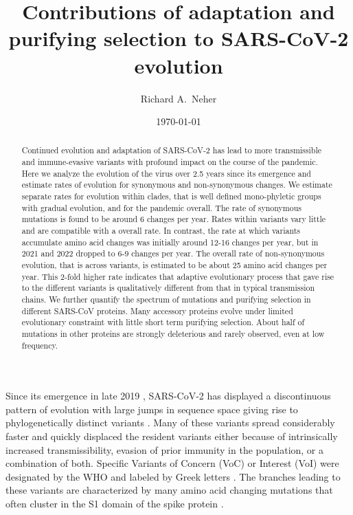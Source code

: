 \documentclass[aps,rmp, twocolumn]{revtex4}
\begin{document}
\title{Contributions of adaptation and purifying selection to SARS-CoV-2 evolution}
\author{Richard A.~Neher}
\address{Biozentrum, University of Basel, Basel, Switzerland }
\address{Swiss Institute of Bioinformatics, Switzerland }

\date{\today}

\begin{abstract}
Continued evolution and adaptation of SARS-CoV-2 has lead to more transmissible and immune-evasive variants with profound impact on the course of the pandemic.
Here we analyze the evolution of the virus over 2.5 years since its emergence and estimate rates of evolution for synonymous and non-synonymous changes.
We estimate separate rates for evolution within clades, that is well defined mono-phyletic groups with gradual evolution, and for the pandemic overall.
The rate of synonymous mutations is found to be around 6 changes per year.
Rates within variants vary little and are compatible with a overall rate.
In contrast, the rate at which variants accumulate amino acid changes was initially around 12-16 changes per year, but in 2021 and 2022 dropped to 6-9 changes per year.
The overall rate of non-synonymous evolution, that is across variants, is estimated to be about 25 amino acid changes per year.
This 2-fold higher rate indicates that adaptive evolutionary process that gave rise to the different variants is qualitatively different from that in typical transmission chains.
We further quantify the spectrum of mutations and purifying selection in different SARS-CoV proteins.
Many accessory proteins evolve under limited evolutionary constraint with little short term purifying selection.
About half of mutations in other proteins are strongly deleterious and rarely observed, even at low frequency.
\end{abstract}

\maketitle

Since its emergence in late 2019 \citep{zhu_novel_2020}, SARS-CoV-2 has displayed a discontinuous pattern of evolution with large jumps in sequence space giving rise to phylogenetically distinct variants \citep{hodcroft_spread_2021,volz_assessing_2021,tegally_detection_2021,faria_genomics_2021,naveca_covid-19_2021,viana_rapid_2022}.
Many of these variants spread considerably faster and quickly displaced the resident variants either because of intrinsically increased transmissibility, evasion of prior immunity in the population, or a combination of both.
Specific Variants of Concern (VoC) or Interest (VoI) were designated by the WHO and labeled by Greek letters \citep{konings_sars-cov-2_2021}.
The branches leading to these variants are characterized by many amino acid changing mutations that often cluster in the S1 domain of the spike protein \citep{kistler_rapid_2022}.
\end{document}
